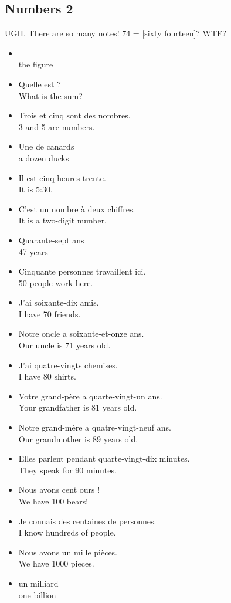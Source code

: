 \pagebreak
\subsection{Numbers 2}

UGH.  There are so many notes!  74 = [sixty fourteen]?  WTF?

\begin{itemize}
  \item  {} \\ the figure
  \item  Quelle est  ? \\ What is the sum?
	\item  Trois et cinq sont des nombres. \\ 3 and 5 are numbers.
	\item  Une  de canards \\ a dozen ducks
	\item  Il est cinq heures trente. \\ It is 5:30.
	\item  C'est un nombre {\`a} deux chiffres. \\ It is a two-digit number.
	\item  Quarante-sept ans \\ 47 years
	\item  Cinquante personnes travaillent ici. \\ 50 people work here.
	\item  J'ai soixante-dix amis. \\ I have 70 friends.
	\item  Notre oncle a soixante-et-onze ans. \\ Our uncle is 71 years old.
	\item  J'ai quatre-vingts chemises. \\ I have 80 shirts.
	\item  Votre grand-p{\`e}re a quarte-vingt-un ans. \\ Your grandfather is 81 years old.
	\item  Notre grand-m{\`e}re a quatre-vingt-neuf ans. \\ Our grandmother is 89 years old.
	\item  Elles parlent pendant quarte-vingt-dix minutes. \\ They speak for 90 minutes.
	\item  Nous avons cent ours ! \\ We have 100 bears!
	\item  Je connais des centaines de personnes. \\ I know hundreds of people.
	\item  Nous avons un mille pi{\`e}ces. \\ We have 1000 pieces.
	\item  un milliard \\ one billion
\end{itemize}


